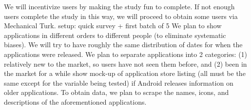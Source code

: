 We will incentivize users by making the study fun to complete. If not enough users complete the study in this way, we will proceed to obtain some users via Mechanical Turk.
setup: quick survey + first batch of 5
We plan to show applications in different orders to different people (to eliminate systematic biases).
We will try to have roughly the same distribution of dates for when the applications were released.
We plan to separate applications into 2 categories: (1) relatively new to the market, so users have not seen them before, and (2) been in the market for a while
show mock-up of application store listing (all must be the same except for the variable being tested) if Android releases information on older applications.
To obtain data, we plan to scrape the names, icons, and descriptions of the aforementioned applications.
